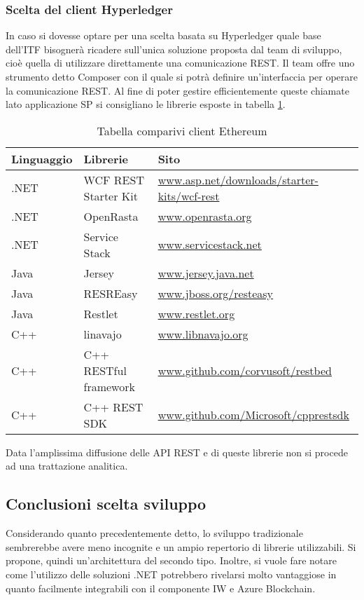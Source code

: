 \subsubsection{Scelta del client Hyperledger}
In caso si dovesse optare per una scelta basata su Hyperledger quale base dell’ITF bisognerà ricadere sull’unica soluzione proposta dal team di sviluppo, cioè quella di utilizzare direttamente una comunicazione REST. Il team offre uno strumento detto Composer con il quale si potrà definire un’interfaccia per operare la comunicazione REST. Al fine di poter gestire efficientemente queste chiamate lato applicazione SP si consigliano le librerie esposte in tabella \ref{tab:comp-client-hyp}.
\begin{table}[!h] %
    \caption{Tabella comparivi client Ethereum}
    \label{tab:comp-client-hyp}
    \begin{tabularx}{\textwidth}{|X|X|X|}
    \hline
    \textbf{Linguaggio} & \textbf{Librerie} & \textbf{Sito}\\
    \hline
    .NET   & WCF REST Starter Kit  & \url{www.asp.net/downloads/starter-kits/wcf-rest} \\
    \hline
    .NET   & OpenRasta & \url{www.openrasta.org} \\
    \hline
    .NET   & Service Stack  & \url{www.servicestack.net} \\
    \hline
    Java  & Jersey & \url{www.jersey.java.net} \\
    \hline
    Java  & RESREasy & \url{www.jboss.org/resteasy}\\
    \hline
    Java  & Restlet & \url{www.restlet.org}\\
    \hline
    C++  & linavajo & \url{www.libnavajo.org}\\
    \hline
    C++  & C++ RESTful framework & \url{www.github.com/corvusoft/restbed}\\
    \hline
    C++  & C++ REST SDK & \url{www.github.com/Microsoft/cpprestsdk}\\
    \hline
    \end{tabularx}
\end{table}%
Data l’amplissima diffusione delle API REST e di queste librerie non si procede ad una trattazione analitica.
\subsection{Conclusioni scelta sviluppo}
Considerando quanto precedentemente detto, lo sviluppo tradizionale sembrerebbe avere meno incognite e un ampio repertorio di librerie utilizzabili. Si propone, quindi un’architettura del secondo tipo.
Inoltre, si vuole fare notare come l’utilizzo delle soluzioni .NET potrebbero rivelarsi molto vantaggiose in quanto facilmente integrabili con il componente IW e Azure Blockchain.
